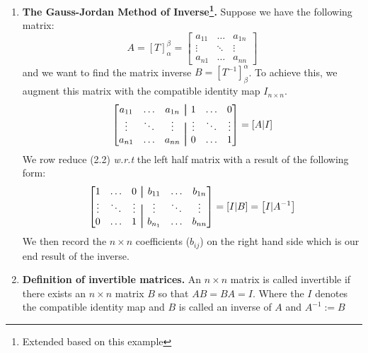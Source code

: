 \documentclass[oneside, 12pt]{book}
\newcommand{\settag}[1]{\renewcommand{\theenumi}{#1}}
\newcommand{\tbf}[1]{\textbf{#1}}
\newcommand\aug{\fboxsep=-\fboxrule\!\!\!\fbox{\strut}\!\!\!}
\newcommand{\para}[1]{\item \tbf{#1}}
\begin{document}
\begin{enumerate}
    \settag{2.6.9}
    \para{The Gauss-Jordan Method of Inverse\footnote{Extended based on this example}.} Suppose we have the following matrix:
    \begin{equation*}
    A = \left[T\right]_\alpha^\beta = 
        \begin{bmatrix}
            a_{11} & \hdots & a_{1n} \\
            \vdots & \ddots & \vdots \\
            a_{n1} & \ldots & a_{nn}
        \end{bmatrix}
    \end{equation*}
    and we want to find the matrix inverse $B = \left[T^{-1}\right]_\beta^\alpha$. To achieve this, we augment this matrix with the compatible identity map $I_{n\times n}$.
    \begin{equation}
        \begin{bmatrix}
            a_{11} & \hdots & a_{1n} &\aug & 1 & \ldots & 0 \\
            \vdots & \ddots & \vdots &\aug & \vdots & \ddots & \vdots \\
            a_{n1} & \ldots & a_{nn} &\aug & 0 & \ldots & 1
        \end{bmatrix} 
        = \left[A|I\right]
    \end{equation}
    We row reduce (2.2) \textit{w.r.t} the left half matrix with a result of the following form:
    \begin{equation*}
        \begin{bmatrix}
            1 & \ldots & 0 &\aug & b_{11} & \hdots & b_{1n}  \\
            \vdots & \ddots & \vdots &\aug & \vdots & \ddots & \vdots \\
            0 & \ldots & 1 &\aug & b_{n_1} & \ldots & b_{nn}
        \end{bmatrix} 
        = \left[I|B\right] = \left[I|A^{-1}\right]
    \end{equation*}
    We then record the $n\times n$ coefficients ($b_{ij}$) on the right hand side which is our end result of the inverse.
    
    \settag{2.6.10}
    \para{Definition of invertible matrices.} An $n \times n $ matrix is called invertible if there exists an $n\times n$ matrix $B$ so that $AB = BA = I$. Where the $I$ denotes the compatible identity map and $B$ is called an inverse of $A$ and $A^{-1} := B$
    

\end{enumerate}
\end{document}
